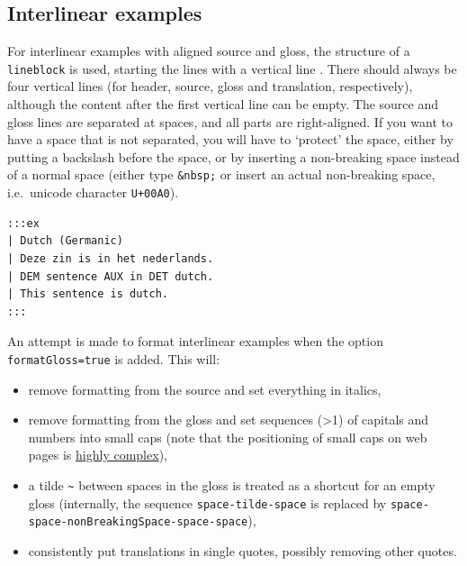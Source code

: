 \documentclass[
]{article}
\providecommand{\tightlist}{%
  \setlength{\itemsep}{0pt}\setlength{\parskip}{0pt}}
\begin{document}
\hypertarget{interlinear-examples}{%
\subsection{Interlinear examples}\label{interlinear-examples}}

For interlinear examples with aligned source and gloss, the structure of
a \texttt{lineblock} is used, starting the lines with a vertical line
\texttt{\textbar{}}. There should always be four vertical lines (for
header, source, gloss and translation, respectively), although the
content after the first vertical line can be empty. The source and gloss
lines are separated at spaces, and all parts are right-aligned. If you
want to have a space that is not separated, you will have to `protect'
the space, either by putting a backslash before the space, or by
inserting a non-breaking space instead of a normal space (either type
\texttt{\&nbsp;} or insert an actual non-breaking space, i.e.~unicode
character \texttt{U+00A0}).

\begin{verbatim}
:::ex
| Dutch (Germanic)
| Deze zin is in het nederlands.
| DEM sentence AUX in DET dutch.
| This sentence is dutch.
:::
\end{verbatim}

\begin{samepage}
\begin{exe} \judgewidth{}
  \label{ex4.10}
\end{exe}
\end{samepage}

An attempt is made to format interlinear examples when the option
\texttt{formatGloss=true} is added. This will:

\begin{itemize}
\tightlist
\item
  remove formatting from the source and set everything in italics,
\item
  remove formatting from the gloss and set sequences (\textgreater1) of
  capitals and numbers into small caps (note that the positioning of
  small caps on web pages is
  \href{https://iamvdo.me/en/blog/css-font-metrics-line-height-and-vertical-align}{highly
  complex}),
\item
  a tilde \texttt{\textasciitilde{}} between spaces in the gloss is
  treated as a shortcut for an empty gloss (internally, the sequence
  \texttt{space-tilde-space} is replaced by
  \texttt{space-space-nonBreakingSpace-space-space}),
\item
  consistently put translations in single quotes, possibly removing
  other quotes.
\end{itemize}
\end{document}

